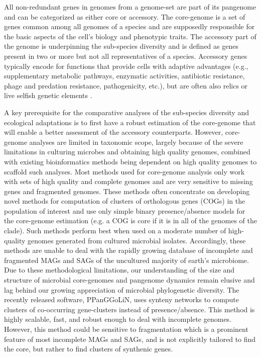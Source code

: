 \documentclass{article}
\begin{document}
All non-redundant genes in genomes from a genome-set are part of its pangenome and can be categorized as either core or accessory\citep{brockhurst_2019}. The core-genome is a set of genes common among all genomes of a species and are supposedly responsible for the basic aspects of the cell’s biology and phenotypic traits\citep{medini_2005}. The accessory part of the genome is underpinning the sub-species diversity and is defined as genes present in two or more but not all representatives of a species. Accessory genes typically encode for functions that provide cells with adaptive advantages (e.g., supplementary metabolic pathways, enzymatic activities, antibiotic resistance, phage and predation resistance, pathogenicity, etc.)\citep{brockhurst_2019, medini_2005, domingo-sananes_2021}, but are often also relics or live selfish genetic elements \citep{gil_2012}.

A key prerequisite for the comparative analyses of the sub-species diversity and ecological adaptations is to first have a robust estimation of the core-genome that will enable a better assessment of the accessory counterparts. However, core-genome analyses are limited in taxonomic scope\citep{biller_2015, fang_2011, blaustein_2019, delmont_2018, lopez-perez_2016, deschamps_2014}, largely because of the severe limitations in culturing microbes and obtaining high quality genomes, combined with existing bioinformatics methods being dependent on high quality genomes to scaffold such analyses. Most methods used for core-genome analysis only work with sets of high quality and complete genomes and are very sensitive to missing genes and fragmented genomes\citep{page_2015}. These methods often concentrate on developing novel methods for computation of clusters of orthologous genes (COGs) in the population of interest\citep{page_2015} and use only simple binary presence/absence models for the core-genome estimation (e.g. a COG is core if it is in all of the genomes of the clade). Such methods perform best when used on a moderate number of high-quality genomes generated from cultured microbial isolates. Accordingly, these methods are unable to deal with the rapidly growing database of incomplete and fragmented MAGs and SAGs of the uncultured majority of earth’s microbiome\citep{nayfach_2021}. Due to these methodological limitations, our understanding of the size and structure of microbial core-genomes and pangenome dynamics remain elusive and lag behind our growing appreciation of microbial phylogenetic diversity. The recently released software, PPanGGoLiN, uses synteny networks to compute clusters of co-occurring gene-clusters instead of presence/absence. This method is highly scalable, fast, and robust enough to deal with incomplete genomes\citep{gautreau_2020}. However, this method could be sensitive to fragmentation which is a prominent feature of most incomplete MAGs and SAGs, and is not explicitly tailored to find the core, but rather to find clusters of synthenic genes.
\end{document}
